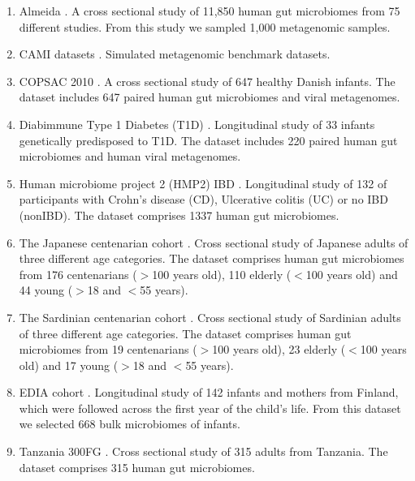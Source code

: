 \begin{enumerate}[label=Dataset \Roman*.]
    \item Almeida \cite{Almeida2019-fk}. A cross sectional study of 11,850 human gut microbiomes from 75 different studies. From this study we sampled 1,000 metagenomic samples.
    
    \item CAMI datasets \cite{Sczyrba2017-ay}. Simulated metagenomic benchmark datasets.
    
    \item COPSAC 2010 \cite{Shah_undated-vc}. A cross sectional study of 647 healthy Danish infants. The dataset includes 647 paired human gut microbiomes and viral metagenomes. 
    
    \item Diabimmune Type 1 Diabetes (T1D) \cite{Zhao2017-uf}. Longitudinal study of 33 infants genetically predisposed to T1D. The dataset includes 220 paired human gut microbiomes and human viral metagenomes.
    
    \item Human microbiome project 2 (HMP2) IBD \cite{Lloyd-Price2019-cw}. Longitudinal study of 132 of participants with Crohn's disease (CD), Ulcerative colitis (UC) or no IBD (nonIBD). The dataset comprises 1337 human gut microbiomes.
    
    \item The Japanese centenarian cohort \cite{Sato2021-zh}. Cross sectional study of Japanese adults of three different age categories. The dataset comprises human gut microbiomes from 176 centenarians ($>$100 years old), 110 elderly ($<$100 years old) and 44 young ($>$18 and $<$55 years).
    
    \item The Sardinian centenarian cohort \cite{Wu2019-wo}. Cross sectional study of Sardinian adults of three different age categories. The dataset comprises human gut microbiomes from 19 centenarians ($>$100 years old), 23 elderly ($<$100 years old) and 17 young ($>$18 and $<$55 years).
    
    \item EDIA cohort \cite{Vatanen2022-vg}. Longitudinal study of 142 infants and mothers from Finland, which were followed across the first year of the child's life. From this dataset we selected 668 bulk microbiomes of infants.
    
    \item Tanzania 300FG \cite{Strazar2021-fu}. Cross sectional study of 315 adults from Tanzania. The dataset comprises 315 human gut microbiomes.

\end{enumerate}